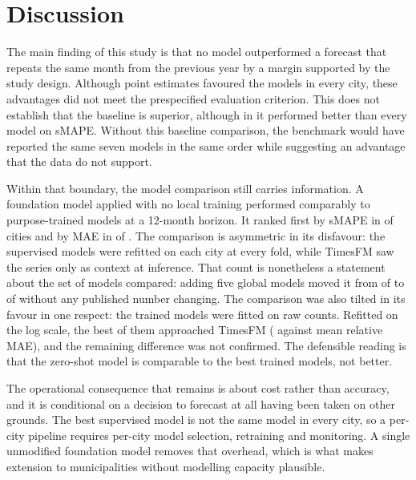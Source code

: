 \documentclass[10pt,letterpaper]{article}
\begin{document}
{

\section*{Discussion}

The main finding of this study is that no model outperformed a forecast that repeats the same month from the previous year by a margin supported by the study design. Although point estimates favoured the models in every city, these advantages did not meet the prespecified evaluation criterion. This does not establish that the baseline is superior, although in  it performed better than every model on sMAPE. Without this baseline comparison, the benchmark would have reported the same seven models in the same order while suggesting an advantage that the data do not support.

Within that boundary, the model comparison still carries information. A foundation model applied with no local training performed comparably to  purpose-trained models at a 12-month horizon. It ranked first by sMAPE in  of  cities and by MAE in  of . The comparison is asymmetric in its disfavour: the supervised models were refitted on each city at every fold, while TimesFM saw the series only as context at inference. That count is nonetheless a statement about the set of models compared: adding five global models moved it from  of  to  of  without any published number changing. The comparison was also tilted in its favour in one respect: the trained models were fitted on raw counts. Refitted on the log scale, the best of them approached TimesFM ( against  mean relative MAE), and the remaining difference was not confirmed. The defensible reading is that the zero-shot model is comparable to the best trained models, not better.

The operational consequence that remains is about cost rather than accuracy, and it is conditional on a decision to forecast at all having been taken on other grounds. The best supervised model is not the same model in every city, so a per-city pipeline requires per-city model selection, retraining and monitoring. A single unmodified foundation model removes that overhead, which is what makes extension to municipalities without modelling capacity plausible.

}
\end{document}
